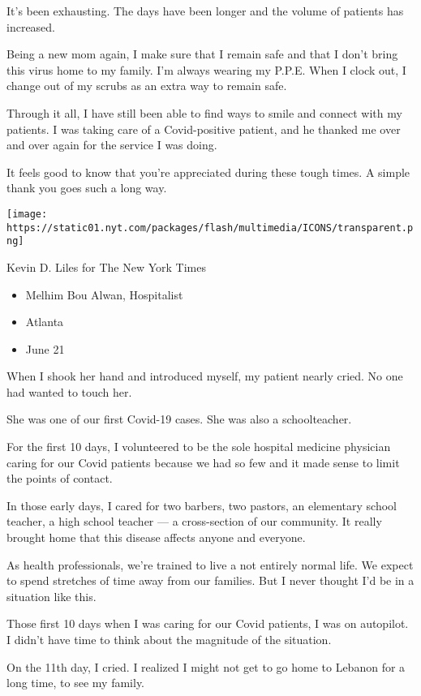 It's been exhausting. The days have been longer and the volume of
patients has increased.

Being a new mom again, I make sure that I remain safe and that I don't
bring this virus home to my family. I'm always wearing my P.P.E. When I
clock out, I change out of my scrubs as an extra way to remain safe.

Through it all, I have still been able to find ways to smile and connect
with my patients. I was taking care of a Covid-positive patient, and he
thanked me over and over again for the service I was doing.

It feels good to know that you're appreciated during these tough times.
A simple thank you goes such a long way.

\texttt{[image: https://static01.nyt.com/packages/flash/multimedia/ICONS/transparent.png]}

Kevin D. Liles for The New York Times

\begin{itemize}
\tightlist
\item
  Melhim Bou Alwan, Hospitalist
\item
  Atlanta
\item
  June 21
\end{itemize}

When I shook her hand and introduced myself, my patient nearly cried. No
one had wanted to touch her.

She was one of our first Covid-19 cases. She was also a schoolteacher.

For the first 10 days, I volunteered to be the sole hospital medicine
physician caring for our Covid patients because we had so few and it
made sense to limit the points of contact.

In those early days, I cared for two barbers, two pastors, an elementary
school teacher, a high school teacher --- a cross-section of our
community. It really brought home that this disease affects anyone and
everyone.

As health professionals, we're trained to live a not entirely normal
life. We expect to spend stretches of time away from our families. But I
never thought I'd be in a situation like this.

Those first 10 days when I was caring for our Covid patients, I was on
autopilot. I didn't have time to think about the magnitude of the
situation.

On the 11th day, I cried. I realized I might not get to go home to
Lebanon for a long time, to see my family.

